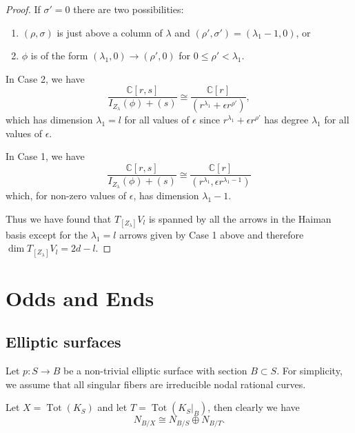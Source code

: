 \documentclass[12pt]{amsart}
\theoremstyle{definition}
\newcommand{\CC} {\mathbb{C}}          %
\newcommand{\Tot}{\operatorname{Tot}}
\begin{document}
\begin{proof}
If $\sigma '=0$ there are two possibilities:
\begin{enumerate}
\item $(\rho ,\sigma )$ is just above a column of $\lambda$ and $(\rho
',\sigma ')=(\lambda_{1}-1,0)$, or
\item $\phi$ is of the form $(\lambda_{1},0)\to (\rho ',0)$ for $0\leq
\rho '<\lambda_{1}$. 
\end{enumerate}
In Case 2, we have 
\[
\frac{\CC [r,s]}{I_{Z_{\lambda}}(\phi ) + (s)} \cong \frac{\CC
[r]}{(r^{\lambda_{1}}+\epsilon r^{\rho '})},
\]
which has dimension $\lambda_{1}=l$ for all values of $\epsilon$ since
$r^{\lambda_{1}}+\epsilon r^{\rho '}$ has degree $\lambda_{1}$ for all
values of $\epsilon$.

In Case 1, we have
\[
\frac{\CC [r,s]}{I_{Z_{\lambda}}(\phi ) + (s)} \cong \frac{\CC
[r]}{(r^{\lambda_{1}},\epsilon  r^{\lambda_{1}-1})}
\]
which, for non-zero values of $\epsilon$, has dimension
$\lambda_{1}-1$.

Thus we have found that $T_{[Z_{\lambda}]}V_{l}$ is spanned by all the
arrows in the Haiman basis except for the $\lambda_{1}=l$ arrows given
by Case 1 above and therefore $\dim T_{[Z_{\lambda}]}V_{l} = 2d-l$.
\end{proof}


\appendix
\section{Odds and Ends}\label{appendix: odds and ends}

\subsection{Elliptic surfaces}\label{subsec: elliptic surfs}

Let $p : S \rightarrow B$ be a non-trivial elliptic surface with
section $B \subset S$. For simplicity, we assume that all singular
fibers are irreducible nodal rational curves.

Let $X=\Tot (K_{S})$ and let $T=\Tot (K_{S}|_B)$, then clearly we have
\[
N_{B/X}\cong N_{B/S}\oplus N_{B/T}. 
\]
\end{document}
